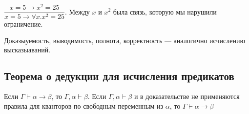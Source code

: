 \begin{example}
$\dfrac{x = 5 \to x^2 = 25}{x = 5 \to \forall x. x^2 = 25}$. Между $x$ и $x^2$ была связь, которую мы нарушили ограничение.
\end{example}

\begin{statement}
    Доказыуемость, выводимость, полнота, корректность --- аналогично исчислению высказыаваний.
\end{statement}


\subsection{Теорема о дедукции для исчисления предикатов}
\begin{theorem}
    Если    $\Gamma \vdash \alpha \to \beta$, то $\Gamma, \alpha \vdash \beta$.
    Если $\Gamma, \alpha\vdash \beta$ и в доказательстве не применяются правила для кванторов по свободным переменным из $\alpha$, то $\Gamma\vdash \alpha \to \beta$
\end{theorem}
